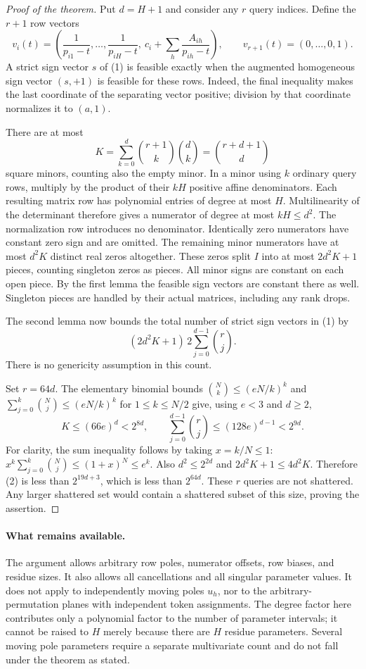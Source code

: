 \documentclass[11pt]{article}
\begin{document}
\begin{proof}[Proof of the theorem]
Put $d=H+1$ and consider any $r$ query indices. Define the $r+1$
row vectors
\[
 v_i(t)=\left(\frac1{p_{i1}-t},\ldots,
          \frac1{p_{iH}-t},\ c_i+\sum_h\frac{A_{ih}}{p_{ih}-t}\right),
 \qquad v_{r+1}(t)=(0,\ldots,0,1).
\]
A strict sign vector $s$ of (1) is feasible exactly when the
augmented homogeneous sign vector $(s,+1)$ is feasible for these
rows. Indeed, the final inequality makes the last coordinate of
the separating vector positive; division by that coordinate
normalizes it to $(a,1)$.

There are at most
\[
 K=\sum_{k=0}^{d}\binom{r+1}{k}\binom{d}{k}
   =\binom{r+d+1}{d}
\]
square minors, counting also the empty minor. In a minor using $k$
ordinary query rows, multiply by the product of their $kH$
positive affine denominators. Each resulting matrix row has
polynomial entries of degree at most $H$. Multilinearity of the
determinant therefore gives a numerator of degree at most
$kH\leq d^2$. The normalization row introduces no denominator.
Identically zero numerators have constant zero sign and are omitted.
The remaining minor numerators have at most $d^2K$ distinct real
zeros altogether. These zeros split $I$ into at most $2d^2K+1$
pieces, counting singleton zeros as pieces. All minor signs are
constant on each open piece. By the first lemma the feasible sign
vectors are constant there as well. Singleton pieces are handled
by their actual matrices, including any rank drops.

The second lemma now bounds the total number of strict sign
vectors in (1) by
\[
 (2d^2K+1)\,2\sum_{j=0}^{d-1}\binom rj.
 \tag{2}
\]
There is no genericity assumption in this count.

Set $r=64d$. The elementary binomial bounds
$\binom Nk\leq(eN/k)^k$ and
$\sum_{j=0}^k\binom Nj\leq(eN/k)^k$ for $1\leq k\leq N/2$
give, using $e<3$ and $d\geq2$,
\[
 K\leq(66e)^d<2^{8d},\qquad
 \sum_{j=0}^{d-1}\binom rj\leq(128e)^{d-1}<2^{9d}.
\]
For clarity, the sum inequality follows by taking $x=k/N\leq1$:
$x^k\sum_{j=0}^k\binom Nj\leq(1+x)^N\leq e^k$.
Also $d^2\leq2^{2d}$ and $2d^2K+1\leq4d^2K$. Therefore (2) is
less than $2^{19d+3}$, which is less than $2^{64d}$. These $r$
queries are not shattered. Any larger shattered set would contain
a shattered subset of this size, proving the assertion.
\end{proof}

\paragraph{What remains available.}
The argument allows arbitrary row poles, numerator offsets, row
biases, and residue sizes. It also allows all cancellations and
all singular parameter values. It does not apply to independently
moving poles $u_h$, nor to the arbitrary-permutation planes with
independent token assignments. The degree factor here contributes
only a polynomial factor to the number of parameter intervals;
it cannot be raised to $H$ merely because there are $H$ residue
parameters. Several moving pole parameters require a separate
multivariate count and do not fall under the theorem as stated.
\end{document}
